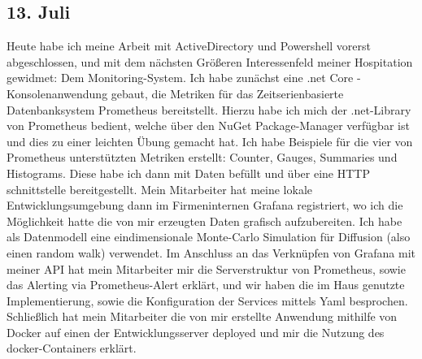 \subsection{13. Juli}
Heute habe ich meine Arbeit mit ActiveDirectory und Powershell vorerst abgeschlossen, und mit dem nächsten Größeren Interessenfeld meiner Hospitation gewidmet: Dem Monitoring-System. Ich habe zunächst eine .net Core - Konsolenanwendung gebaut, die Metriken für das Zeitserienbasierte Datenbanksystem Prometheus bereitstellt. Hierzu habe ich mich der .net-Library von Prometheus bedient, welche über den NuGet Package-Manager verfügbar ist und dies zu einer leichten Übung gemacht hat. Ich habe Beispiele für die vier von Prometheus unterstützten Metriken erstellt: Counter, Gauges, Summaries und Histograms. Diese habe ich dann mit Daten befüllt und über eine HTTP schnittstelle bereitgestellt. Mein Mitarbeiter hat meine lokale Entwicklungsumgebung dann im Firmeninternen Grafana registriert, wo ich die Möglichkeit hatte die von mir erzeugten Daten grafisch aufzubereiten. Ich habe als Datenmodell eine eindimensionale Monte-Carlo Simulation für Diffusion (also einen random walk) verwendet. Im Anschluss an das Verknüpfen von Grafana mit meiner API hat mein Mitarbeiter mir die Serverstruktur von Prometheus, sowie das Alerting via Prometheus-Alert erklärt, und wir haben die im Haus genutzte Implementierung, sowie die Konfiguration der Services mittels Yaml besprochen. Schließlich hat mein Mitarbeiter die von mir erstellte Anwendung mithilfe von Docker auf einen der Entwicklungsserver deployed und mir die Nutzung des docker-Containers erklärt.